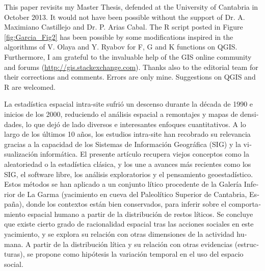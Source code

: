 \myseparator
This paper revisits my Master Thesis, defended at the University of Cantabria in October 2013. It would not have been possible without the support of Dr. A. Maximiano Castillejo and Dr. P. Arias Cabal. 
The R script posted in Figure \ref{fig:Garcia_Fig2} has been possible by some modifications inspired in the algorithms of V. Olaya and Y. Ryabov for F, G and K functions on QGIS. Furthermore, I am grateful to the invaluable help of the GIS online community and forums (\href{http://gis.stackexchange.com}{http://gis.stackexchange.com}). Thanks also to the editorial team for their corrections and comments. Errors are only mine. Suggestions on QGIS and R are welcomed. 


\begin{myabstract}
\foreignlanguage{spanish}{La estadística espacial intra-site sufrió un descenso durante la década de 1990 e inicios de los 2000, reduciendo el análisis espacial a remontajes y mapas de densidades, lo que dejó de lado diversos e interesantes enfoques cuantitativos. A lo largo de los últimos 10 años, los estudios intra-site han recobrado su relevancia gracias a la capacidad de los Sistemas de Información Geográfica (SIG) y la visualización informática. El presente artículo recupera viejos conceptos como la aleatoriedad o la estadística clásica, y los une a avances más recientes como los SIG, el software libre, los análisis exploratorios y el pensamiento geoestadístico. Estos métodos se han aplicado a un conjunto lítico procedente de la Galería Inferior de La Garma (yacimiento en cueva del Paleolítico Superior de Cantabria, España), donde los contextos están bien conservados, para inferir sobre el comportamiento espacial humano a partir de la distribución de restos líticos. Se concluye que existe cierto grado de racionalidad espacial tras las acciones sociales en este yacimiento, y se explora su relación con otras dimensiones de la actividad humana. A partir de la distribución lítica y su relación con otras evidencias (estructuras), se propone como hipótesis la variación temporal en el uso del espacio social.}

	

\end{myabstract}

	
\printbibliography[heading=subbibnumbered] 
\label{Garcia:lastpage}
\closingarticle